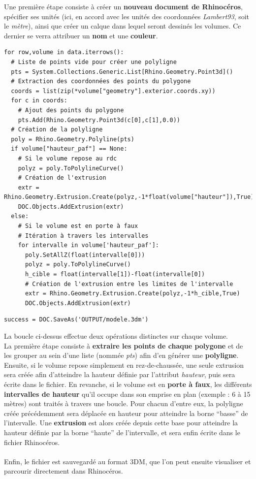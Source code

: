 \documentclass[
  11pt,
  french,
]{article}
\begin{document}
Une première étape consiste à créer un \textbf{nouveau document de
Rhinocéros}, spécifier ses unités (ici, en accord avec les unités des
coordonnées \emph{Lambert93}, soit le \emph{mètre}), ainsi que créer un
calque dans lequel seront dessinés les volumes. Ce dernier se verra
attribuer un \textbf{nom} et une \textbf{couleur}.

\begin{tcolorbox}[title= Construction des volumes en 3D et export au format .3DM ,colback=boitecode]
\begin{lstlisting}[style=code]
for row,volume in data.iterrows():
  # Liste de points vide pour créer une polyligne
  pts = System.Collections.Generic.List[Rhino.Geometry.Point3d]()
  # Extraction des coordonnées des points du polygone
  coords = list(zip(*volume["geometry"].exterior.coords.xy))
  for c in coords:
    # Ajout des points du polygone
    pts.Add(Rhino.Geometry.Point3d(c[0],c[1],0.0))
  # Création de la polyligne
  poly = Rhino.Geometry.Polyline(pts)
  if volume["hauteur_paf"] == None:
    # Si le volume repose au rdc
    polyz = poly.ToPolylineCurve()
    # Création de l'extrusion
    extr = Rhino.Geometry.Extrusion.Create(polyz,-1*float(volume["hauteur"]),True)
    DOC.Objects.AddExtrusion(extr)
  else:
    # Si le volume est en porte à faux
    # Itération à travers les intervalles
    for intervalle in volume['hauteur_paf']:
      poly.SetAllZ(float(intervalle[0]))
      polyz = poly.ToPolylineCurve()
      h_cible = float(intervalle[1])-float(intervalle[0])
      # Création de l'extrusion entre les limites de l'intervalle
      extr = Rhino.Geometry.Extrusion.Create(polyz,-1*h_cible,True)
      DOC.Objects.AddExtrusion(extr)\end{lstlisting}
\begin{lstlisting}[style=code]
success = DOC.SaveAs('OUTPUT/modele.3dm')\end{lstlisting}
\end{tcolorbox}

La boucle ci-dessus effectue deux opérations distinctes sur chaque
volume.\\
La première étape consiste à \textbf{extraire les points de chaque
polygone} et de les grouper au sein d'une liste (nommée \emph{pts}) afin
d'en générer une \textbf{polyligne}.\\
Ensuite, si le volume repose simplement en rez-de-chaussée, une seule
extrusion sera créée afin d'atteindre la hauteur définie par l'attribut
\emph{hauteur}, puis sera écrite dans le fichier. En revanche, si le
volume est en \textbf{porte à faux}, les différents \textbf{intervalles
de hauteur} qu'il occupe dans son emprise en plan (exemple : 6 à 15
mètres) sont traités à travers une boucle. Pour chacun d'entre eux, la
polyligne créée précédemment sera déplacée en hauteur pour atteindre la
borne ``basse'' de l'intervalle. Une \textbf{extrusion} est alors créée
depuis cette base pour atteindre la hauteur définie par la borne
``haute'' de l'intervalle, et sera enfin écrite dans le fichier
Rhinocéros.\\
~\\
Enfin, le fichier est sauvegardé au format 3DM, que l'on peut ensuite
visualiser et parcourir directement dans Rhinocéros.
\end{document}

